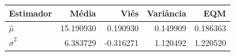 \begin{tabular}{lrrrr}
\toprule
Estimador & Média & Viés & Variância & EQM \\
\midrule
$\hat{\mu}$ & 15.190930 & 0.190930 & 0.149909 & 0.186363 \\
$\hat{\sigma}^2$ & 6.383729 & -0.316271 & 1.120492 & 1.220520 \\
\bottomrule
\end{tabular}

